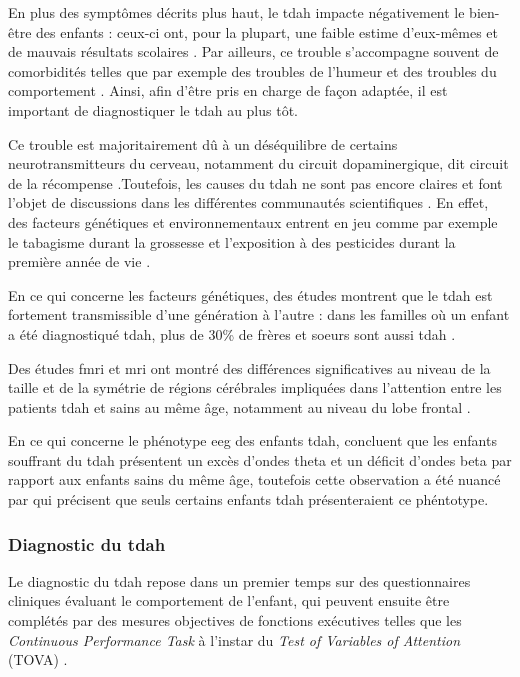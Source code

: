 En plus des symptômes décrits plus haut, le \gls{tdah} impacte négativement le bien-être des enfants : ceux-ci ont, pour la plupart, une faible estime d'eux-mêmes 
\citep{Shaw2005} et de mauvais résultats scolaires \citep{Barry2002}. Par ailleurs, ce trouble s'accompagne souvent de comorbidités telles que par exemple 
des troubles de l'humeur et des troubles du comportement \citep{Monastra2005}. Ainsi, afin d'être pris en charge de façon adaptée, il est important de diagnostiquer 
le \gls{tdah} au plus tôt. 

Ce trouble est majoritairement dû à un déséquilibre de certains neurotransmitteurs du cerveau, notamment du circuit dopaminergique, 
dit circuit de la récompense \citep{Daley2010, Punja2016}.Toutefois, les causes du \gls{tdah} ne sont pas encore claires et font l'objet de discussions
dans les différentes communautés scientifiques \citep{Galera2014}. En effet, des facteurs génétiques et environnementaux entrent en jeu comme par exemple le tabagisme durant la grossesse 
et l'exposition à des pesticides durant la première année de vie \citep{Galera2014}.

En ce qui concerne les facteurs génétiques, des études montrent que le \gls{tdah} est fortement transmissible d'une génération à l'autre :
dans les familles où un enfant a été diagnostiqué \gls{tdah}, plus de 30\% de frères et soeurs sont aussi \gls{tdah} \citep{Monastra2005}.

Des études \gls{fmri} et \gls{mri} ont montré des différences significatives au niveau de la taille et de la symétrie de régions cérébrales impliquées
dans l'attention entre les patients \gls{tdah} et sains au même âge, notamment au niveau du lobe frontal \citep{Monastra2005}.  

En ce qui concerne le phénotype \gls{eeg} des enfants \gls{tdah}, \citet{Lubar1991} concluent que les enfants souffrant du \gls{tdah} présentent un excès 
d'ondes theta et un déficit d'ondes beta par rapport aux enfants sains du même âge, toutefois cette observation a été nuancé par \citep{Arns2012} qui précisent
que seuls certains enfants \gls{tdah} présenteraient ce phéntotype. 

\subsubsection{Diagnostic du \gls{tdah}}

Le diagnostic du \gls{tdah} repose dans un premier temps sur des questionnaires cliniques évaluant le comportement de l'enfant, qui peuvent ensuite être
complétés par des mesures objectives de fonctions exécutives telles que les \textit{Continuous Performance Task} \citep{Barkley1991} à l'instar du 
\textit{Test of Variables of Attention} (TOVA) \citep{Forbes1998}.

